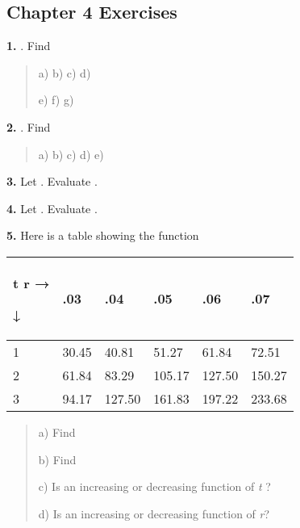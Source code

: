 \hypertarget{chapter-4-exercises}{\subsection{Chapter 4
Exercises}\label{chapter-4-exercises}}

\textbf{1.} . Find

\begin{quote}
a) b) c) d)

e) f) g)
\end{quote}

\textbf{2.} . Find

\begin{quote}
a) b) c) d) e)
\end{quote}

\textbf{3.} Let . Evaluate .

\textbf{4.} Let . Evaluate .

\textbf{5.} Here is a table showing the function

\begin{longtable}[]{@{}llllll@{}}
\toprule
\begin{minipage}[b]{0.16\columnwidth}\raggedright\strut
t r →

↓\strut
\end{minipage} & \begin{minipage}[b]{0.16\columnwidth}\raggedright\strut
.03\strut
\end{minipage} & \begin{minipage}[b]{0.16\columnwidth}\raggedright\strut
.04\strut
\end{minipage} & \begin{minipage}[b]{0.16\columnwidth}\raggedright\strut
.05\strut
\end{minipage} & \begin{minipage}[b]{0.16\columnwidth}\raggedright\strut
.06\strut
\end{minipage} & \begin{minipage}[b]{0.16\columnwidth}\raggedright\strut
.07\strut
\end{minipage}\tabularnewline
\midrule
\endhead
1 & 30.45 & 40.81 & 51.27 & 61.84 & 72.51\tabularnewline
2 & 61.84 & 83.29 & 105.17 & 127.50 & 150.27\tabularnewline
3 & 94.17 & 127.50 & 161.83 & 197.22 & 233.68\tabularnewline
\bottomrule
\end{longtable}

\begin{quote}
a) Find

b) Find

c) Is an increasing or decreasing function of \emph{t} ?

d) Is an increasing or decreasing function of \emph{r}?
\end{quote}

